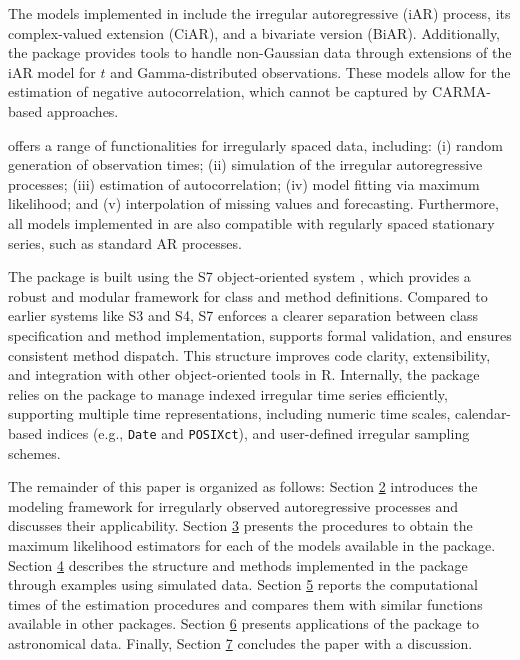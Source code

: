 The models implemented in  include the irregular autoregressive (iAR) process, its complex-valued extension (CiAR), and a bivariate version (BiAR). Additionally, the package provides tools to handle non-Gaussian data through extensions of the iAR model for \(t\) and Gamma-distributed observations. These models allow for the estimation of negative autocorrelation, which cannot be captured by CARMA-based approaches.

 offers a range of functionalities for irregularly spaced data, including: (i) random generation of observation times; (ii) simulation of the irregular autoregressive processes; (iii) estimation of autocorrelation; (iv) model fitting via maximum likelihood; and (v) interpolation of missing values and forecasting. Furthermore, all models implemented in  are also compatible with regularly spaced stationary series, such as standard AR processes.

The package is built using the S7 object-oriented system \citep{VaughanHesterKalinowskiLandauLawrenceMaechlerTierneyWickham2024}, which provides a robust and modular framework for class and method definitions. Compared to earlier systems like S3 and S4, S7 enforces a clearer separation between class specification and method implementation, supports formal validation, and ensures consistent method dispatch. This structure improves code clarity, extensibility, and integration with other object-oriented tools in R. Internally, the package relies on the  package \citep{ZeileisGrothendieck2005} to manage indexed irregular time series efficiently, supporting multiple time representations, including numeric time scales,
calendar-based indices (e.g., \texttt{Date} and \texttt{POSIXct}), and user-defined irregular sampling schemes.

The remainder of this paper is organized as follows:
Section \hyperref[models]{2} introduces the modeling framework for irregularly observed autoregressive processes and discusses their applicability.
Section \hyperref[sec:estimation]{3} presents the procedures to obtain the maximum likelihood estimators for each of the models available in the  package.
Section \hyperref[sec:usage]{4} describes the structure and methods implemented in the package through examples using simulated data.
Section \hyperref[sec:cpu]{5} reports the computational times of the estimation procedures and compares them with similar functions available in other packages.
Section \hyperref[sec:applications]{6} presents applications of the  package to astronomical data.
Finally, Section \hyperref[sec:discussion]{7} concludes the paper with a discussion.

